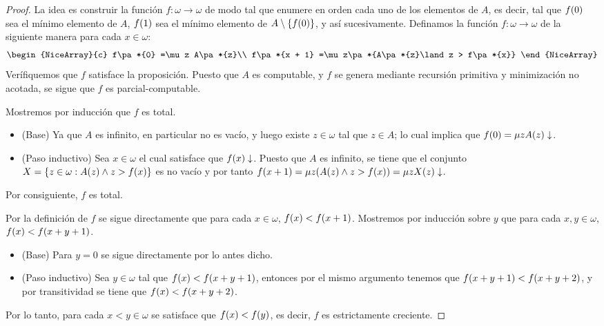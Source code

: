 \begin{proof}
	La idea es construir la función $f:\omega\to\omega$ de modo tal que enumere en orden cada uno de los elementos de $A$, es decir, tal que $f\pa*{0}$ sea el mínimo elemento de $A$, $f\pa*{1}$ sea el mínimo elemento de $A\setminus\set*{f\pa*{0}}$, y así sucesivamente. Definamos la función $f:\omega\to\omega$ de la siguiente manera para cada $x\in\omega$:
	\[
		\begin{NiceArray}{c}
			f\pa*{0} =\mu z A\pa*{z}\\
			f\pa*{x + 1} =\mu z\pa*{A\pa*{z}\land z > f\pa*{x}}
		\end{NiceArray}
	\]
	Verífiquemos que $f$ satisface la proposición. Puesto que $A$ es computable, y $f$ se genera mediante recursión primitiva y minimización no acotada, se sigue que $f$ es parcial-computable.

	Mostremos por inducción que $f$ es total.

	\begin{itemize}
		\item (Base) Ya que $A$ es infinito, en particular no es vacío, y luego existe $z\in\omega$ tal que $z\in A$; lo cual implica que $f\pa*{0} =\mu z A\pa*{z}\ACABA$.
		\item (Paso inductivo) Sea $x\in\omega$ el cual satisface que $f\pa*{x}\ACABA$. Puesto que $A$ es infinito, se tiene que el conjunto $X =\set*{z\in\omega: A\pa*{z}\land z > f\pa*{x}}$ es no vacío y por tanto $f\pa*{x + 1} =\mu z\pa*{A\pa*{z}\land z > f\pa*{x}} =\mu z X\pa*{z}\ACABA$.
	\end{itemize}

	Por consiguiente, $f$ es total.

	Por la definición de $f$ se sigue directamente que para cada $x\in\omega$, $f\pa*{x} < f\pa*{x + 1}$. Mostremos por inducción sobre $y$ que para cada $x, y\in\omega$, $f\pa*{x} < f\pa*{x + y + 1}$.

	\begin{itemize}
		\item (Base) Para $y = 0$ se sigue directamente por lo antes dicho.
		\item (Paso inductivo) Sea $y\in\omega$ tal que $f\pa*{x} < f\pa*{x + y + 1}$, entonces por el mismo argumento tenemos que $f\pa*{x + y + 1} < f\pa*{x + y + 2}$, y por transitividad se tiene que $f\pa*{x} < f\pa*{x + y + 2}$.
	\end{itemize}

	Por lo tanto, para cada $x < y\in\omega$ se satisface que $f\pa*{x} < f\pa*{y}$, es decir, $f$ es estrictamente creciente.


\end{proof}
